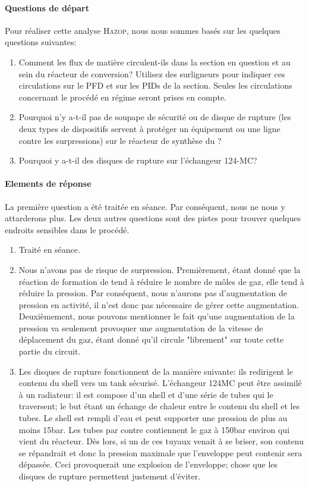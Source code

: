 \documentclass{article}
\begin{document}
\paragraph{Questions de départ} Pour réaliser cette analyse \textsc{Hazop}, nous nous sommes basés sur les quelques questions suivantes:
\begin{enumerate}
\item Comment les flux de matière circulent-ils dans la section en question et au sein du réacteur de conversion?
Utilisez des surligneurs pour indiquer ces circulations sur le PFD et sur les PIDs de la section. Seules
les circulations concernant le procédé en régime seront prises en compte.
\item Pourquoi n’y a-t-il pas de soupape de sécurité ou de disque de rupture (les deux types de dispositifs
servent à protéger un équipement ou une ligne contre les surpressions) sur le réacteur de synthèse du ?
\item Pourquoi y a-t-il des disques de rupture sur l’échangeur 124-MC?
\end{enumerate}

\paragraph{Elements de réponse} La première question a été traitée en séance. Par conséquent, nous ne nous y attarderons plus. Les deux autres questions sont des pistes pour trouver quelques endroits sensibles dans le procédé.

\begin{enumerate}
\item Traité en séance.
\item Nous n'avons pas de risque de surpression. Premièrement, étant donné que la réaction de formation de  tend à
réduire le nombre de môles de gaz, elle tend à réduire la pression. Par conséquent, nous n'aurons pas d'augmentation de
pression en activité, il n'est donc pas nécessaire de gérer cette augmentation. Deuxièmement, nous pouvons mentionner le
fait qu'une augmentation de la pression va seulement provoquer une augmentation de la vitesse de déplacement du gaz, étant
donné qu'il circule "librement" sur toute cette partie du circuit.
\item Les disques de rupture fonctionnent de la manière suivante: ils
redirigent le contenu du shell vers un tank sécurisé. L'échangeur 124MC peut être assimilé à un radiateur: il est compose d'un shell et d'une série de tubes qui le traversent; le but étant un échange de chaleur entre le contenu du shell et les tubes. Le shell est rempli d'eau et peut supporter une pression de plus au moins \unit{15}{bar}. Les tubes par contre contiennent le gaz à \unit{150}{bar} environ qui vient du réacteur. Dès lors, si un de ces tuyaux venait à se briser, son contenu se répandrait et donc la pression maximale que l'enveloppe peut contenir sera dépassée. Ceci provoquerait une explosion de l'enveloppe; chose que
les disques de rupture permettent justement d'éviter. 
\end{enumerate}
\end{document}
